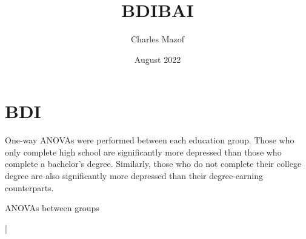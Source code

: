 \documentclass{article}
\title{BDIBAI}
\author{Charles Mazof}
\date{August 2022}
\begin{document}
\maketitle

\section{BDI}

One-way ANOVAs were performed between each education group. Those who only complete high school are significantly more depressed than those who complete a bachelor's degree. Similarly, those who do not complete their college degree are also significantly more depressed than their degree-earning counterparts.

\begin{table}[ht]
\centering
\caption{ANOVAs between groups}{|} \label{tab:title}


\end{table}
\end{document}
